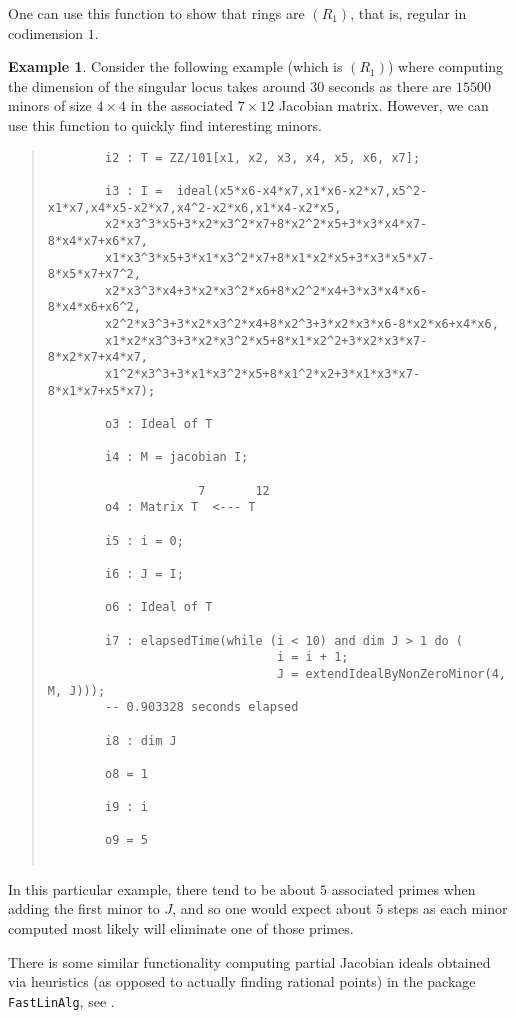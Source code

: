 \documentclass[11pt]{amsart}
\theoremstyle{definition}
\newtheorem{example}{Example}[section]
\begin{document}
One can use this function to show that rings are $(R_1)$, that is, regular in codimension $1$.

\begin{example}
    Consider the following example (which is $(R_1)$) where computing the dimension of the singular locus takes around $30$ seconds as there are $15500$ minors of size $4 \times 4$ in the associated $7 \times 12$ Jacobian matrix.  However, we can use this function to quickly find interesting minors.
  {{\small\color{blue}
  \begin{quote}
\begin{verbatim}
		i2 : T = ZZ/101[x1, x2, x3, x4, x5, x6, x7];
		
		i3 : I =  ideal(x5*x6-x4*x7,x1*x6-x2*x7,x5^2-x1*x7,x4*x5-x2*x7,x4^2-x2*x6,x1*x4-x2*x5,
		x2*x3^3*x5+3*x2*x3^2*x7+8*x2^2*x5+3*x3*x4*x7-8*x4*x7+x6*x7,
		x1*x3^3*x5+3*x1*x3^2*x7+8*x1*x2*x5+3*x3*x5*x7-8*x5*x7+x7^2,
		x2*x3^3*x4+3*x2*x3^2*x6+8*x2^2*x4+3*x3*x4*x6-8*x4*x6+x6^2,
		x2^2*x3^3+3*x2*x3^2*x4+8*x2^3+3*x2*x3*x6-8*x2*x6+x4*x6,
		x1*x2*x3^3+3*x2*x3^2*x5+8*x1*x2^2+3*x2*x3*x7-8*x2*x7+x4*x7,
		x1^2*x3^3+3*x1*x3^2*x5+8*x1^2*x2+3*x1*x3*x7-8*x1*x7+x5*x7);
		
		o3 : Ideal of T
		
		i4 : M = jacobian I;
		
		             7       12
		o4 : Matrix T  <--- T
		
		i5 : i = 0;
		
		i6 : J = I;
		
		o6 : Ideal of T
		
		i7 : elapsedTime(while (i < 10) and dim J > 1 do (
                                i = i + 1; 
                                J = extendIdealByNonZeroMinor(4, M, J)));
		-- 0.903328 seconds elapsed
		
		i8 : dim J
		
		o8 = 1
		
		i9 : i
		
		o9 = 5
		
\end{verbatim}
\end{quote}\vspace{-1em}    
    }}    
    \noindent
    In this particular example, there tend to be about $5$ associated primes when adding the first minor to $J$, and so one would expect about $5$ steps as each minor computed most likely will eliminate one of those primes.
\end{example} 

There is some similar functionality computing partial Jacobian ideals obtained via heuristics (as opposed to actually finding rational points) in the package {\tt FastLinAlg}, see \cite{FastLinAlgSource}.




\end{document}
